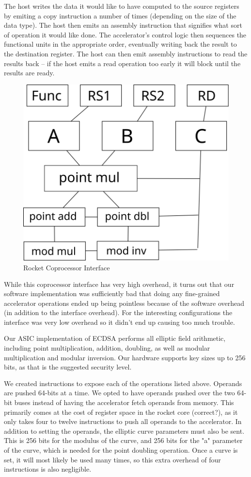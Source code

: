 \documentclass[twocolumn]{article}
\begin{document}
The host writes the data it would like to have computed to the source
registers by emiting a copy instruction a number of times (depending
on the size of the data type).  The host then emits an assembly
instruction that signifies what sort of operation it would like done.
The accelerator's control logic then sequences the functional units in
the appropriate order, eventually writing back the result to the
destination register.  The host can then emit assembly instructions to
read the results back -- if the host emits a read operation too early
it will block until the results are ready.

\begin{figure}[t]
  \begin{center}
    \includegraphics[width=0.5\linewidth]{coproc.svg}
  \end{center}

  \caption{Rocket Coprocessor Interface
    \label{coproc}}
\end{figure}

While this coprocessor interface has very high overhead, it turns out
that our software implementation was sufficiently bad that doing any
fine-grained accelerator operations ended up being pointless because
of the software overhead (in addition to the interface overhead).  For
the interesting configurations the interface was very low overhead so
it didn't end up causing too much trouble.

Our ASIC implementation of ECDSA performs all elliptic field arithmetic,
including point multiplication, addition, doubling, as well as modular
multiplication and modular inversion. Our hardware supports key sizes
up to 256 bits, as that is the suggested security level.

We created instructions to expose each of the operations listed
above. Operands are pushed 64-bits at a time. We opted to have
operands pushed over the two 64-bit buses instead of having the
accelerator fetch operands from memory. This primarily comes at the
cost of register space in the rocket core (correct?), as it only takes
four to twelve instructions to push all operands to the
accelerator. In addition to setting the operands, the elliptic curve
parameters must also be sent. This is 256 bits for the modulus of the
curve, and 256 bits for the "a" parameter of the curve, which is
needed for the point doubling operation. Once a curve is set, it will
most likely be used many times, so this extra overhead of four
instructions is also negligible.
\end{document}
